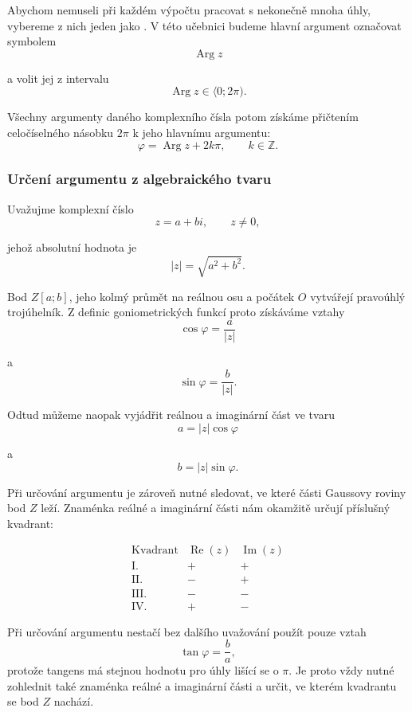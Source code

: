 \documentclass[12pt,a4paper]{article}
\begin{document}
Abychom nemuseli při každém výpočtu pracovat s nekonečně mnoha úhly, vybereme
z nich jeden jako .
V této učebnici budeme hlavní argument označovat symbolem
\[
    \operatorname{Arg} z
\]

a volit jej z intervalu
\[
    \operatorname{Arg} z\in\langle0;2\pi).
\]

Všechny argumenty daného komplexního čísla potom získáme přičtením celočíselného
násobku $2\pi$ k jeho hlavnímu argumentu:
\[
    \varphi=\operatorname{Arg}z+2k\pi, \qquad k\in\mathbb{Z}.
\]


\subsubsection*{Určení argumentu z algebraického tvaru}
Uvažujme komplexní číslo
\[
    z=a+bi, \qquad z\neq0,
\]

jehož absolutní hodnota je
\[
    |z|=\sqrt{a^2+b^2}.
\]

Bod $Z[a;b]$, jeho kolmý průmět na reálnou osu a počátek $O$ vytvářejí pravoúhlý trojúhelník. 
Z definic goniometrických funkcí proto získáváme vztahy
\[
    \cos\varphi=\frac{a}{|z|}
\]

a
\[
    \sin\varphi=\frac{b}{|z|}.
\]

Odtud můžeme naopak vyjádřit reálnou a imaginární část ve tvaru
\[
    a=|z|\cos\varphi
\]

a
\[
    b=|z|\sin\varphi.
\]

Při určování argumentu je zároveň nutné sledovat, ve které části Gaussovy roviny bod $Z$ leží.
Znaménka reálné a imaginární části nám okamžitě určují příslušný kvadrant:

\[
    \begin{array}{c|c|c}
        \text{Kvadrant} & \operatorname{Re}(z) & \operatorname{Im}(z) \\ \hline
        \mathrm{I.}   & + & + \\
        \mathrm{II.}  & - & + \\
        \mathrm{III.} & - & - \\
        \mathrm{IV.}  & + & -
    \end{array}
\]

\begin{notebox}
    Při určování argumentu nestačí bez dalšího uvažování použít pouze vztah
    \[
        \tan\varphi=\frac{b}{a},
    \]
    protože tangens má stejnou hodnotu pro úhly lišící se o $\pi$. 
    Je proto vždy nutné zohlednit také znaménka reálné a imaginární části a určit, 
    ve kterém kvadrantu se bod $Z$ nachází.
\end{notebox}
\end{document}
